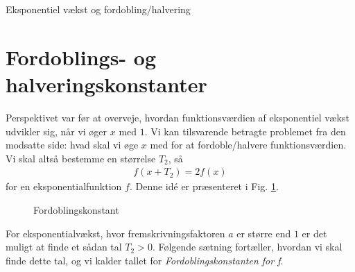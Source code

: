 \documentclass[12pt]{article}
\begin{document}



\begin{center}
\Huge
Eksponentiel vækst og fordobling/halvering
\end{center}
\section*{Fordoblings- og halveringskonstanter}
Perspektivet var før at overveje, hvordan funktionsværdien af eksponentiel vækst udvikler sig, når vi øger $x$ med $1$. Vi kan tilsvarende betragte problemet fra den modsatte side: hvad skal vi øge $x$ med for at fordoble/halvere funktionsværdien. Vi skal altså bestemme en størrelse $T_2$, så 
\begin{align*}
f(x+T_2) = 2f(x)
\end{align*}
for en eksponentialfunktion $f$. Denne idé er præsenteret i Fig. \ref{fig:Fordobling}. 
\begin{figure}[H]
\center
{}
\caption{Fordoblingskonstant}
\label{fig:Fordobling}

\end{figure}
For eksponentialvækst, hvor fremskrivningsfaktoren $a$ er større end $1$ er det muligt at finde et sådan tal $T_2>0$. Følgende sætning fortæller, hvordan vi skal finde dette tal, og vi kalder tallet for \textit{Fordoblingskonstanten for f}.
\end{document}
